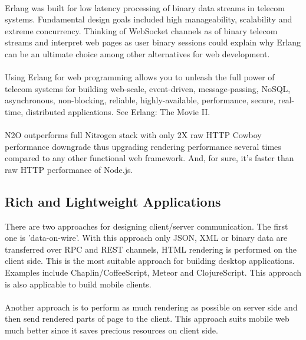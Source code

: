 
\paragraph{}
Erlang was built for low latency processing of binary data streams in telecom systems.
Fundamental design goals included high manageability, scalability
and extreme concurrency. Thinking of WebSocket channels as of binary
telecom streams and interpret web pages as user binary sessions
could explain why Erlang can be an ultimate choice 
among other alternatives for web development.

\paragraph{}
Using Erlang for web programming allows you to unleash the full power of telecom systems for
building web-scale, event-driven, message-passing, NoSQL, asynchronous, non-blocking,
reliable, highly-available, performance, secure, real-time, distributed applications.
See Erlang: The Movie II.

\paragraph{}
N2O outperforms full Nitrogen stack with only 2X raw HTTP Cowboy
performance downgrade thus upgrading rendering performance several
times compared to any other functional web framework. And, for
sure, it's faster than raw HTTP performance of Node.js.

\subsection{Rich and Lightweight Applications}
There are two approaches for designing client/server communication.
The first one is 'data-on-wire'. With this approach only JSON, XML or binary
data are transferred over RPC and REST channels, HTML rendering
is performed on the client side. This is the most suitable approach for building desktop
applications. Examples include Chaplin/CoffeeScript, Meteor
and ClojureScript. This approach is also applicable to build mobile clients.

\paragraph{}
Another approach is to perform as much rendering as possible on server side and 
then send rendered parts of page to the client. This approach suits 
mobile web much better since it saves precious resources on client side.



